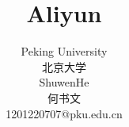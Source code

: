 \documentclass[12pt,twiside,a4paper]{ctexbook}
\numberwithin{chapter}{part}
\begin{document}

\author
{
Peking University\\
北京大学\\
ShuwenHe\\
何书文\\
1201220707@pku.edu.cn
}


\title{Aliyun}
\maketitle
\tableofcontents %
\newpage
\pagestyle{fancy}
\end{document}
